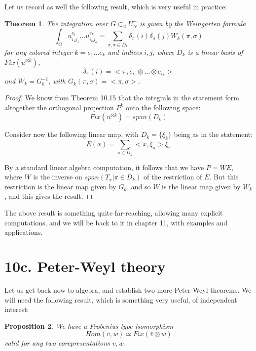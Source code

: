 \documentclass[12pt]{amsbook}
\newtheorem{theorem}{Theorem}[chapter]
\newtheorem{proposition}[theorem]{Proposition}
\begin{document}
Let us record as well the following result, which is very useful in practice:


\begin{theorem}
The integration over $G\subset_uU_N^+$ is given by the Weingarten formula
$$\int_Gu_{i_1j_1}^{e_1}\ldots u_{i_kj_k}^{e_k}=\sum_{\pi,\sigma\in D_k}\delta_\pi(i)\delta_\sigma(j)W_k(\pi,\sigma)$$
for any colored integer $k=e_1\ldots e_k$ and indices $i,j$, where $D_k$ is a linear basis of $Fix(u^{\otimes k})$, 
$$\delta_\pi(i)=<\pi,e_{i_1}\otimes\ldots\otimes e_{i_k}>$$
and $W_k=G_k^{-1}$, with $G_k(\pi,\sigma)=<\pi,\sigma>$.
\end{theorem}

\begin{proof}
We know from Theorem 10.15 that the integrals in the statement form altogether the orthogonal projection $P^k$ onto the following space:
$$Fix(u^{\otimes k})=span(D_k)$$

Consider now the following linear map, with $D_k=\{\xi_k\}$ being as in the statement:
$$E(x)=\sum_{\pi\in D_k}<x,\xi_\pi>\xi_\pi$$

By a standard linear algebra computation, it follows that we have $P=WE$, where $W$ is the inverse on $span(T_\pi|\pi\in D_k)$ of the restriction of $E$. But this restriction is the linear map given by $G_k$, and so $W$ is the linear map given by $W_k$, and this gives the result.
\end{proof}

The above result is something quite far-reaching, allowing many explicit computations, and we will be back to it in chapter 11, with examples and applications.

\section*{10c. Peter-Weyl theory}

Let us get back now to algebra, and establish two more Peter-Weyl theorems. We will need the following result, which is something very useful, of independent interest:


\begin{proposition}
We have a Frobenius type isomorphism
$$Hom(v,w)\simeq Fix(\bar{v}\otimes w)$$
valid for any two corepresentations $v,w$.
\end{proposition}
\end{document}
